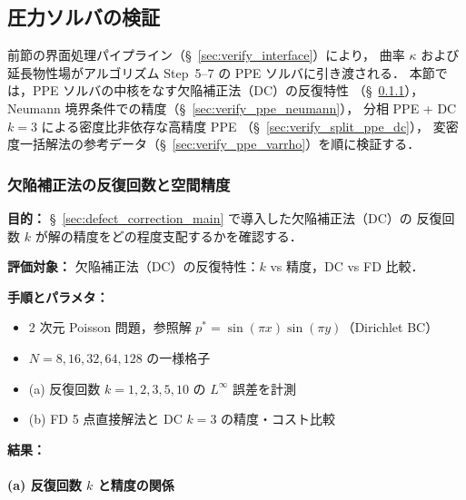 %

\subsection{圧力ソルバの検証}
\label{sec:verify_solver}

前節の界面処理パイプライン（§~\ref{sec:verify_interface}）により，
曲率 $\kappa$ および延長物性場がアルゴリズム Step~5--7 の PPE ソルバに引き渡される．
本節では，PPE ソルバの中核をなす欠陥補正法（DC）の反復特性
（§~\ref{sec:verify_ppe}），
Neumann 境界条件での精度（§~\ref{sec:verify_ppe_neumann}），
分相 PPE + DC $k{=}3$ による密度比非依存な高精度 PPE
（§~\ref{sec:verify_split_ppe_dc}），
変密度一括解法の参考データ（§~\ref{sec:verify_ppe_varrho}）を順に検証する．


\subsubsection{欠陥補正法の反復回数と空間精度}
\label{sec:verify_ppe}
\label{sec:dc_iteration_accuracy}

\noindent\textbf{目的：}
§~\ref{sec:defect_correction_main} で導入した欠陥補正法（DC）の
反復回数 $k$ が解の精度をどの程度支配するかを確認する．

\noindent\textbf{評価対象：}
欠陥補正法（DC）の反復特性：$k$ vs 精度，DC vs FD 比較．

\noindent\textbf{手順とパラメタ：}
\begin{itemize}[noitemsep]
  \item 2 次元 Poisson 問題，参照解 $p^* = \sin(\pi x)\sin(\pi y)$（Dirichlet BC）
  \item $N = 8, 16, 32, 64, 128$ の一様格子
  \item (a) 反復回数 $k = 1, 2, 3, 5, 10$ の $L^\infty$ 誤差を計測
  \item (b) FD 5 点直接解法と DC $k{=}3$ の精度・コスト比較
\end{itemize}

\noindent\textbf{結果：}

\paragraph{(a) 反復回数 $k$ と精度の関係}

